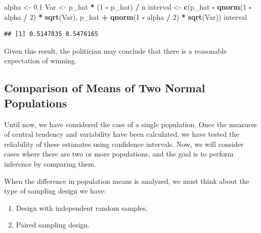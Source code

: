 \documentclass[
]{article}
\newenvironment{Shaded}{\begin{snugshade}}{\end{snugshade}}
\newcommand{\DecValTok}[1]{\textcolor[rgb]{0.00,0.00,0.81}{#1}}
\newcommand{\FloatTok}[1]{\textcolor[rgb]{0.00,0.00,0.81}{#1}}
\newcommand{\FunctionTok}[1]{\textcolor[rgb]{0.13,0.29,0.53}{\textbf{#1}}}
\newcommand{\NormalTok}[1]{#1}
\newcommand{\OtherTok}[1]{\textcolor[rgb]{0.56,0.35,0.01}{#1}}
\newcommand{\SpecialCharTok}[1]{\textcolor[rgb]{0.81,0.36,0.00}{\textbf{#1}}}
\providecommand{\tightlist}{%
  \setlength{\itemsep}{0pt}\setlength{\parskip}{0pt}}
\begin{document}
\begin{Shaded}
\begin{Highlighting}[]
\NormalTok{alpha }\OtherTok{\textless{}{-}} \FloatTok{0.1}
\NormalTok{Var }\OtherTok{\textless{}{-}}\NormalTok{ p\_hat }\SpecialCharTok{*}\NormalTok{ (}\DecValTok{1} \SpecialCharTok{{-}}\NormalTok{ p\_hat) }\SpecialCharTok{/}\NormalTok{ n}
\NormalTok{interval }\OtherTok{\textless{}{-}} \FunctionTok{c}\NormalTok{(p\_hat }\SpecialCharTok{{-}} \FunctionTok{qnorm}\NormalTok{(}\DecValTok{1} \SpecialCharTok{{-}}\NormalTok{ alpha }\SpecialCharTok{/} \DecValTok{2}\NormalTok{) }\SpecialCharTok{*} \FunctionTok{sqrt}\NormalTok{(Var), }
\NormalTok{              p\_hat }\SpecialCharTok{+} \FunctionTok{qnorm}\NormalTok{(}\DecValTok{1} \SpecialCharTok{{-}}\NormalTok{ alpha }\SpecialCharTok{/} \DecValTok{2}\NormalTok{) }\SpecialCharTok{*} \FunctionTok{sqrt}\NormalTok{(Var))}
\NormalTok{interval}
\end{Highlighting}
\end{Shaded}

\begin{verbatim}
## [1] 0.5147835 0.5476165
\end{verbatim}

Given this result, the politician may conclude that there is a
reasonable expectation of winning.

\hypertarget{comparison-of-means-of-two-normal-populations}{%
\subsection{Comparison of Means of Two Normal
Populations}\label{comparison-of-means-of-two-normal-populations}}

Until now, we have considered the case of a single population. Once the
measures of central tendency and variability have been calculated, we
have tested the reliability of these estimates using confidence
intervals. Now, we will consider cases where there are two or more
populations, and the goal is to perform inference by comparing them.

When the difference in population means is analyzed, we must think about
the type of sampling design we have:

\begin{enumerate}
\def\labelenumi{(\roman{enumi})}
\tightlist
\item
  Design with independent random samples,
\item
  Paired sampling design.
\end{enumerate}
\end{document}

